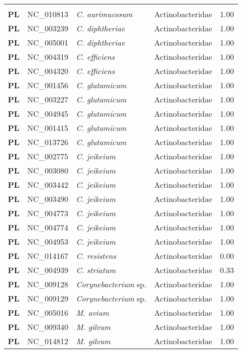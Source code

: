 \begin{adjustwidth}{-3cm}{2cm}
{\begin{supertabular}{>{\bfseries}l|p{0.1\textwidth}p{0.14\textwidth}l|l}
\hline\\
PL & NC\_010813 & \textit{C. aurimucosum} & Actinobacteridae & 1.00\\
PL & NC\_003239 & \textit{C. diphtheriae} & Actinobacteridae & 1.00\\
PL & NC\_005001 & \textit{C. diphtheriae} & Actinobacteridae & 1.00\\
PL & NC\_004319 & \textit{C. efficiens} & Actinobacteridae & 1.00\\
PL & NC\_004320 & \textit{C. efficiens} & Actinobacteridae & 1.00\\
PL & NC\_001456 & \textit{C. glutamicum} & Actinobacteridae & 1.00\\
PL & NC\_003227 & \textit{C. glutamicum} & Actinobacteridae & 1.00\\
PL & NC\_004945 & \textit{C. glutamicum} & Actinobacteridae & 1.00\\
PL & NC\_001415 & \textit{C. glutamicum} & Actinobacteridae & 1.00\\
PL & NC\_013726 & \textit{C. glutamicum} & Actinobacteridae & 1.00\\
PL & NC\_002775 & \textit{C. jeikeium} & Actinobacteridae & 1.00\\
PL & NC\_003080 & \textit{C. jeikeium} & Actinobacteridae & 1.00\\
PL & NC\_003442 & \textit{C. jeikeium} & Actinobacteridae & 1.00\\
PL & NC\_003490 & \textit{C. jeikeium} & Actinobacteridae & 1.00\\
PL & NC\_004773 & \textit{C. jeikeium} & Actinobacteridae & 1.00\\
PL & NC\_004774 & \textit{C. jeikeium} & Actinobacteridae & 1.00\\
PL & NC\_004953 & \textit{C. jeikeium} & Actinobacteridae & 1.00\\
PL & NC\_014167 & \textit{C. resistens} & Actinobacteridae & 0.00\\
PL & NC\_004939 & \textit{C. striatum} & Actinobacteridae & 0.33\\
PL & NC\_009128 & \textit{Corynebacterium} sp. & Actinobacteridae & 1.00\\
PL & NC\_009129 & \textit{Corynebacterium} sp. & Actinobacteridae & 1.00\\
PL & NC\_005016 & \textit{M. avium} & Actinobacteridae & 1.00\\
PL & NC\_009340 & \textit{M. gilvum} & Actinobacteridae & 1.00\\
PL & NC\_014812 & \textit{M. gilvum} & Actinobacteridae & 1.00\\

\end{supertabular}}
\end{adjustwidth}
